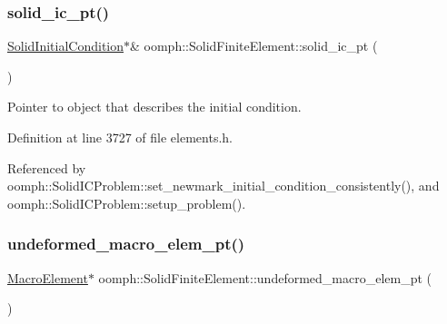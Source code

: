 \mbox{\label{classoomph_1_1SolidFiniteElement_abb6ff13ecd9068e25dba4b8a63ffe5b0}} 
\subsubsection{\texorpdfstring{solid\+\_\+ic\+\_\+pt()}{solid\_ic\_pt()}}
{\footnotesize\ttfamily \hyperlink{classoomph_1_1SolidInitialCondition}{Solid\+Initial\+Condition}$\ast$\& oomph\+::\+Solid\+Finite\+Element\+::solid\+\_\+ic\+\_\+pt (\begin{DoxyParamCaption}{ }\end{DoxyParamCaption})\hspace{0.3cm}{\ttfamily [inline]}}



Pointer to object that describes the initial condition. 



Definition at line 3727 of file elements.\+h.



Referenced by oomph\+::\+Solid\+I\+C\+Problem\+::set\+\_\+newmark\+\_\+initial\+\_\+condition\+\_\+consistently(), and oomph\+::\+Solid\+I\+C\+Problem\+::setup\+\_\+problem().

\mbox{\label{classoomph_1_1SolidFiniteElement_a20517d8d6ba84c8e90d880f38310915f}} 
\subsubsection{\texorpdfstring{undeformed\+\_\+macro\+\_\+elem\+\_\+pt()}{undeformed\_macro\_elem\_pt()}}
{\footnotesize\ttfamily \hyperlink{classoomph_1_1MacroElement}{Macro\+Element}$\ast$ oomph\+::\+Solid\+Finite\+Element\+::undeformed\+\_\+macro\+\_\+elem\+\_\+pt (\begin{DoxyParamCaption}{ }\end{DoxyParamCaption})\hspace{0.3cm}{\ttfamily [inline]}}




